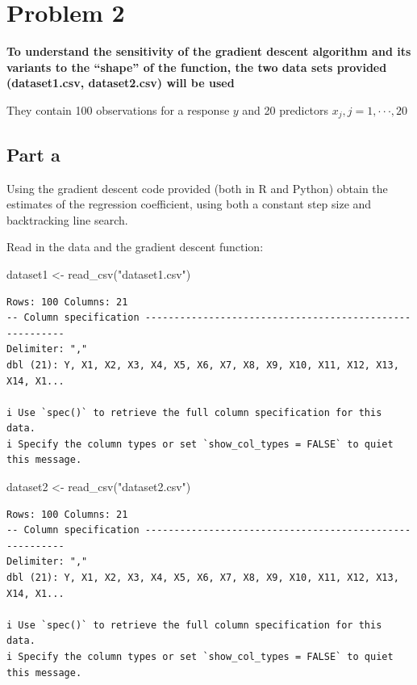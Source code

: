 \documentclass[
  letterpaper,
  DIV=11,
  numbers=noendperiod]{scrartcl}
\newenvironment{Shaded}{\begin{snugshade}}{\end{snugshade}}
\newcommand{\FunctionTok}[1]{\textcolor[rgb]{0.28,0.35,0.67}{#1}}
\newcommand{\NormalTok}[1]{\textcolor[rgb]{0.00,0.23,0.31}{#1}}
\newcommand{\OtherTok}[1]{\textcolor[rgb]{0.00,0.23,0.31}{#1}}
\newcommand{\StringTok}[1]{\textcolor[rgb]{0.13,0.47,0.30}{#1}}
\begin{document}
\section{Problem 2}\label{problem-2}

\textbf{To understand the sensitivity of the gradient descent algorithm
and its variants to the ``shape'' of the function, the two data sets
provided (dataset1.csv, dataset2.csv) will be used}

They contain 100 observations for a response \(y\) and 20 predictors
\(x_j, j = 1, · · · , 20\)

\subsection{Part a}\label{part-a-1}

Using the gradient descent code provided (both in R and Python) obtain
the estimates of the regression coefficient, using both a constant step
size and backtracking line search.

Read in the data and the gradient descent function:

\begin{Shaded}
\begin{Highlighting}[]
\NormalTok{dataset1 }\OtherTok{\textless{}{-}} \FunctionTok{read\_csv}\NormalTok{(}\StringTok{"dataset1.csv"}\NormalTok{)}
\end{Highlighting}
\end{Shaded}

\begin{verbatim}
Rows: 100 Columns: 21
-- Column specification --------------------------------------------------------
Delimiter: ","
dbl (21): Y, X1, X2, X3, X4, X5, X6, X7, X8, X9, X10, X11, X12, X13, X14, X1...

i Use `spec()` to retrieve the full column specification for this data.
i Specify the column types or set `show_col_types = FALSE` to quiet this message.
\end{verbatim}

\begin{Shaded}
\begin{Highlighting}[]
\NormalTok{dataset2 }\OtherTok{\textless{}{-}} \FunctionTok{read\_csv}\NormalTok{(}\StringTok{"dataset2.csv"}\NormalTok{)}
\end{Highlighting}
\end{Shaded}

\begin{verbatim}
Rows: 100 Columns: 21
-- Column specification --------------------------------------------------------
Delimiter: ","
dbl (21): Y, X1, X2, X3, X4, X5, X6, X7, X8, X9, X10, X11, X12, X13, X14, X1...

i Use `spec()` to retrieve the full column specification for this data.
i Specify the column types or set `show_col_types = FALSE` to quiet this message.
\end{verbatim}
\end{document}
